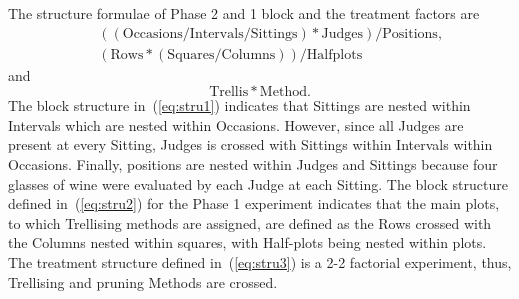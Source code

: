 \documentclass[article]{jss}
\begin{document}
The structure formulae of Phase 2 and 1 block and the treatment factors are
\begin{eqnarray}
\label{eq:stru1}&&\mathrm{((Occasions/Intervals/Sittings)*Judges)/Positions,}\\
\label{eq:stru2}&&\mathrm{(Rows*(Squares/Columns))/Halfplots}
\end{eqnarray}
and
\begin{equation}\label{eq:stru3}
\mathrm{Trellis*Method.}
\end{equation}
The block structure in~(\ref{eq:stru1}) indicates that Sittings are nested within Intervals which are nested within Occasions. However, since all Judges are present at every Sitting, Judges is crossed with Sittings within Intervals within Occasions. Finally, positions are nested within Judges and Sittings because four glasses of wine were evaluated by each Judge at each Sitting. The block structure defined in~(\ref{eq:stru2}) for the Phase 1 experiment indicates that the main plots, to which Trellising methods are assigned, are defined as the Rows crossed with the Columns nested within squares, with Half-plots being nested within plots. The treatment structure defined in~(\ref{eq:stru3}) is a 2-2 factorial experiment, thus, Trellising and pruning Methods are crossed.
\end{document}
